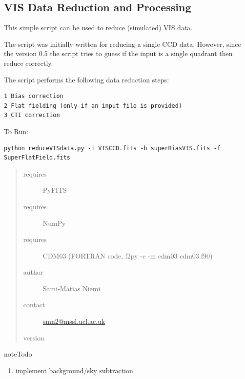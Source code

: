 \documentclass[a4paper,12pt,english]{sphinxmanual}
\begin{document}
\subsection{VIS Data Reduction and Processing}
\label{reduction:vis-data-reduction-and-processing}
This simple script can be used to reduce (simulated) VIS data.

The script was initially written for reducing a single CCD data.
However, since the version 0.5 the script tries to guess if the
input is a single quadrant then reduce correctly.

The script performs the following data reduction steps:

\begin{Verbatim}[commandchars=\\\{\}]
1 Bias correction
2 Flat fielding (only if an input file is provided)
3 CTI correction
\end{Verbatim}

To Run:

\begin{Verbatim}[commandchars=\\\{\}]
python reduceVISdata.py -i VISCCD.fits -b superBiasVIS.fits -f SuperFlatField.fits
\end{Verbatim}
\begin{quote}\begin{description}
\item[{requires}] \leavevmode
PyFITS

\item[{requires}] \leavevmode
NumPy

\item[{requires}] \leavevmode
CDM03 (FORTRAN code, f2py -c -m cdm03 cdm03.f90)

\item[{author}] \leavevmode
Sami-Matias Niemi

\item[{contact}] \leavevmode
\href{mailto:smn2@mssl.ucl.ac.uk}{smn2@mssl.ucl.ac.uk}

\item[{version}] 

\end{description}\end{quote}

\begin{notice}{note}{Todo}
\begin{enumerate}
\item {} 
implement background/sky subtraction

\end{enumerate}
\end{notice}
\end{document}

